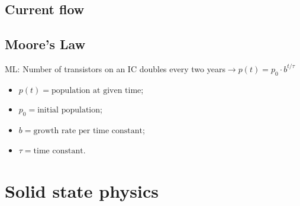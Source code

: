 \documentclass[a4paper, fontsize=8pt, landscape, DIV=1]{scrartcl}
\begin{document}
\begin{multicols*}{4}
    \subsection{Current flow}
    
    \subsection{Moore's Law}
    ML: Number of transistors on an IC doubles every two years$\rightarrow p(t) = p_0 \cdot b^{t/\tau}$
	\begin{itemize}[noitemsep,nolistsep]
		\item$p(t) = \text{population at given time}$;
		\item$p_0 = \text{initial population}$;
		\item$b = \text{growth rate per time constant}$;
		\item$\tau = \text{time constant}$.
	\end{itemize}
      

  \section{Solid state physics}

\end{multicols*}
\end{document}
